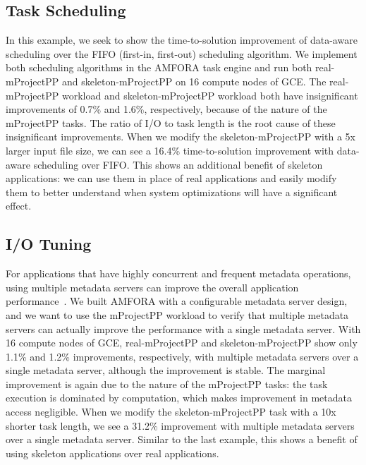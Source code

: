 \documentclass[preprint,12pt]{elsarticle}
\begin{document}
\subsection{Task Scheduling}
In this example, we seek to show the time-to-solution improvement of data-aware scheduling over the FIFO (first-in, first-out) scheduling algorithm.
We implement both scheduling algorithms in the AMFORA task engine and run both  real-mProjectPP  and skeleton-mProjectPP
on 16 compute nodes of GCE. The real-mProjectPP workload and skeleton-mProjectPP workload both have insignificant improvements of 0.7\% and 1.6\%, respectively, because of the nature of the mProjectPP tasks. 
The ratio of I/O to task length is the root cause of these insignificant improvements.
When we modify the skeleton-mProjectPP with a 5x larger input file size, we can see a 16.4\% time-to-solution improvement with data-aware scheduling over FIFO.  This shows an additional benefit of skeleton applications: we can use them in place of real applications and easily modify them to better understand when system optimizations will have a significant effect.

\subsection{I/O Tuning}
For applications that have highly concurrent and frequent metadata operations, using multiple metadata servers can improve the overall application performance~\cite{GIGA+, PVFS2009}.
We built AMFORA with a configurable metadata server design, and we want to use the mProjectPP workload to verify that multiple metadata servers can actually improve
the performance with a single metadata server.
With 16 compute nodes of GCE,  real-mProjectPP and skeleton-mProjectPP show only  1.1\% and 1.2\% improvements, respectively,  with multiple metadata servers over a single metadata server, although
the improvement is stable. 
The marginal improvement is again due to the nature of the mProjectPP tasks: the task execution is dominated by computation, which makes  improvement in metadata access negligible.
When we modify the skeleton-mProjectPP task with a 10x shorter task length, we see a 31.2\% improvement with multiple metadata servers over a single metadata server.  Similar to the last example, this shows a benefit of using skeleton applications over real applications.
\end{document}
